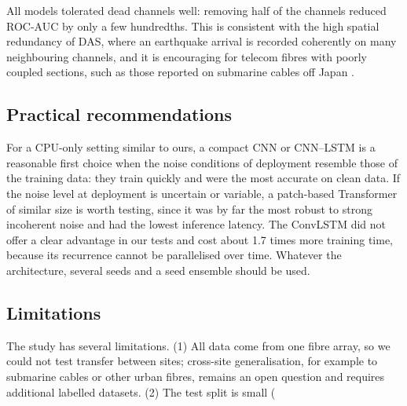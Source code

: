 All models tolerated dead channels well: removing half of the channels reduced ROC-AUC by only a few hundredths. This is consistent with the high spatial redundancy of DAS, where an earthquake arrival is recorded coherently on many neighbouring channels, and it is encouraging for telecom fibres with poorly coupled sections, such as those reported on submarine cables off Japan \citep{Ide2021}.


\subsection*{Practical recommendations}
For a CPU-only setting similar to ours, a compact CNN or CNN--LSTM is a reasonable first choice when the noise conditions of deployment resemble those of the training data: they train quickly and were the most accurate on clean data. If the noise level at deployment is uncertain or variable, a patch-based Transformer of similar size is worth testing, since it was by far the most robust to strong incoherent noise and had the lowest inference latency. The ConvLSTM did not offer a clear advantage in our tests and cost about 1.7 times more training time, because its recurrence cannot be parallelised over time. Whatever the architecture, several seeds and a seed ensemble should be used.

\subsection*{Limitations}
The study has several limitations. (1) All data come from one fibre array, so we could not test transfer between sites; cross-site generalisation, for example to submarine cables or other urban fibres, remains an open question and requires additional labelled datasets. (2) The test split is small (%

